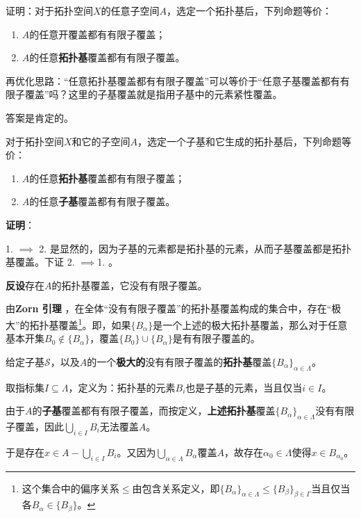 \begin{exercise}{}\label{TychT_exe1}
证明：对于拓扑空间$X$的任意子空间$A$，选定一个拓扑基后，下列命题等价：
\begin{enumerate}
\item $A$的任意开覆盖都有有限子覆盖；
\item $A$的任意\textbf{拓扑基}覆盖都有有限子覆盖。
\end{enumerate}
\end{exercise}

再优化思路：“任意拓扑基覆盖都有有限子覆盖”可以等价于“任意子基覆盖都有有限子覆盖”吗？这里的子基覆盖就是指用子基中的元素紧性覆盖。

答案是肯定的。

\begin{theorem}{}\label{TychT_the1}
对于拓扑空间$X$和它的子空间$A$，选定一个子基和它生成的拓扑基后，下列命题等价：
\begin{enumerate}
\item $A$的任意\textbf{拓扑基}覆盖都有有限子覆盖；
\item $A$的任意\textbf{子基}覆盖都有有限子覆盖。
\end{enumerate}
\end{theorem}

\textbf{证明}：

1. $\implies$ 2. 是显然的，因为子基的元素都是拓扑基的元素，从而子基覆盖都是拓扑基覆盖。下证 2. $\implies$1. 。

\textbf{反设}存在$A$的拓扑基覆盖，它没有有限子覆盖。

由\textbf{Zorn 引理}%
，在全体“没有有限子覆盖”的拓扑基覆盖构成的集合中，存在“极大”的拓扑基覆盖\footnote{这个集合中的偏序关系$\leq$由包含关系定义，即$\{B_\alpha\}_{\alpha\in \Lambda}\leq\{B_\beta\}_{\beta\in \Gamma}$当且仅当各$B_\alpha\in\{B_\beta\}$。}。即，如果$\{B_\alpha\}$是一个上述的极大拓扑基覆盖，那么对于任意基本开集$B_0\not\in\{B_\alpha\}$，覆盖$\{B_0\}\cup\{B_\alpha\}$是有有限子覆盖的。

给定子基$\mathcal{S}$，以及$A$的一个\textbf{极大的}没有有限子覆盖的\textbf{拓扑基}覆盖$\{B_\alpha\}_{\alpha\in \Lambda}$。

取指标集$I\subseteq \Lambda$，定义为：拓扑基的元素$B_i$也是子基的元素，当且仅当$i\in I$。

由于$A$的\textbf{子基}覆盖都有有限子覆盖，而按定义，\textbf{上述拓扑基}覆盖$\{B_\alpha\}_{\alpha\in \Lambda}$没有有限子覆盖，因此$\bigcup_{i\in I} B_i$无法覆盖$A$。

于是存在$x\in A-\bigcup_{i\in I} B_i$。又因为$\bigcup_{\alpha\in \Lambda}B_\alpha$覆盖$A$，故存在$\alpha_0\in\Lambda$使得$x\in B_{\alpha_0}$。

